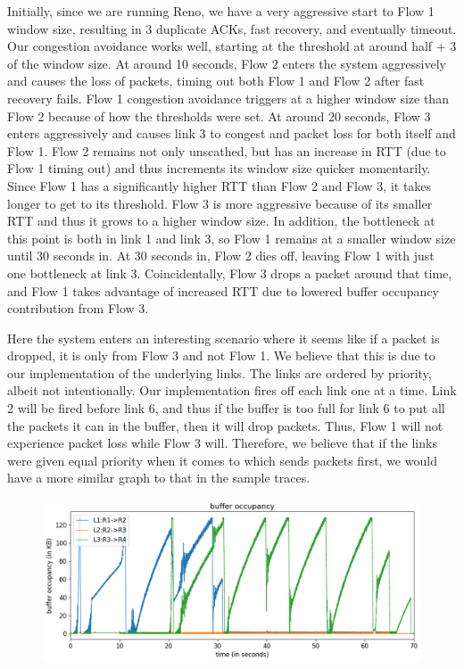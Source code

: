 \documentclass{article}
\begin{document}
Initially, since we are running Reno, we have a very aggressive start to Flow 1 window size, resulting in 3 duplicate ACKs, fast recovery, and eventually timeout. Our congestion avoidance works well, starting at the threshold at around half + 3 of the window size. At around 10 seconds, Flow 2 enters the system aggressively and causes the loss of packets, timing out both Flow 1 and Flow 2 after fast recovery fails. Flow 1 congestion avoidance triggers at a higher window size than Flow 2 because of how the thresholds were set. At around 20 seconds, Flow 3 enters aggressively and causes link 3 to congest and packet loss for both itself and Flow 1. Flow 2 remains not only unscathed, but has an increase in RTT (due to Flow 1 timing out) and thus increments its window size quicker momentarily. Since Flow 1 has a significantly higher RTT than Flow 2 and Flow 3, it takes longer to get to its threshold. Flow 3 is more aggressive because of its smaller RTT and thus it grows to a higher window size. In addition, the bottleneck at this point is both in link 1 and link 3, so Flow 1 remains at a smaller window size until 30 seconds in. At 30 seconds in, Flow 2 dies off, leaving Flow 1 with just one bottleneck at link 3. Coincidentally, Flow 3 drops a packet around that time, and Flow 1 takes advantage of increased RTT due to lowered buffer occupancy contribution from Flow 3. 

Here the system enters an interesting scenario where it seems like if a packet is dropped, it is only from Flow 3 and not Flow 1. We believe that this is due to our implementation of the underlying links. The links are ordered by priority, albeit not intentionally. Our implementation fires off each link one at a time. Link 2 will be fired before link 6, and thus if the buffer is too full for link 6 to put all the packets it can in the buffer, then it will drop packets. Thus, Flow 1 will not experience packet loss while Flow 3 will. Therefore, we believe that if the links were given equal priority when it comes to which sends packets first, we would have a more similar graph to that in the sample traces.

\begin{figure}[H]
\centering
\includegraphics[width = \textwidth]{test_case2_reno buffer occupancy.png}
\end{figure}
\end{document}
